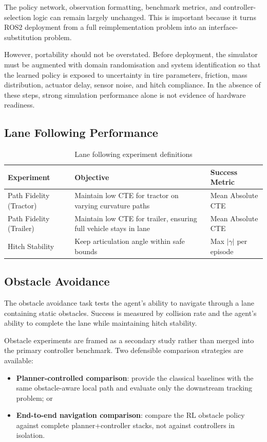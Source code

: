 The policy network, observation formatting, benchmark metrics, and controller-selection logic can remain largely unchanged. This is important because it turns ROS2 deployment from a full reimplementation problem into an interface-substitution problem.

However, portability should not be overstated. Before deployment, the simulator must be augmented with domain randomisation and system identification so that the learned policy is exposed to uncertainty in tire parameters, friction, mass distribution, actuator delay, sensor noise, and hitch compliance. In the absence of these steps, strong simulation performance alone is not evidence of hardware readiness.

\subsection{Lane Following Performance}

\begin{table}[H]
\centering
\caption{Lane following experiment definitions}
\label{tab:forward_experiments}
\begin{tabular}{p{4cm} p{5cm} p{4.5cm}}
\toprule
Experiment & Objective & Success Metric \\
\midrule
Path Fidelity (Tractor)  & Maintain low CTE for tractor on varying curvature paths & Mean Absolute CTE \\
Path Fidelity (Trailer)  & Maintain low CTE for trailer, ensuring full vehicle stays in lane & Mean Absolute CTE \\
Hitch Stability          & Keep articulation angle within safe bounds & Max $|\gamma|$ per episode \\
\bottomrule
\end{tabular}
\end{table}

\subsection{Obstacle Avoidance}

The obstacle avoidance task tests the agent's ability to navigate through a lane containing static obstacles. Success is measured by collision rate and the agent's ability to complete the lane while maintaining hitch stability.

Obstacle experiments are framed as a secondary study rather than merged into the primary controller benchmark. Two defensible comparison strategies are available:
\begin{itemize}
    \item \textbf{Planner-controlled comparison}: provide the classical baselines with the same obstacle-aware local path and evaluate only the downstream tracking problem; or
    \item \textbf{End-to-end navigation comparison}: compare the RL obstacle policy against complete planner+controller stacks, not against controllers in isolation.
\end{itemize}

